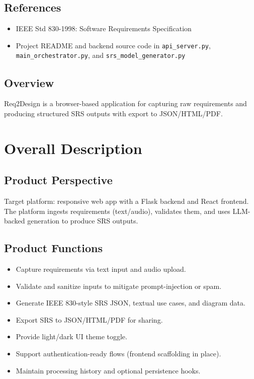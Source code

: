 \documentclass[11pt]{article}
\begin{document}
\subsection{References}
\begin{itemize}
  \item IEEE Std 830-1998: Software Requirements Specification
  \item Project README and backend source code in \texttt{api\_server.py}, \texttt{main\_orchestrator.py}, and \texttt{srs\_model\_generator.py}
\end{itemize}

\subsection{Overview}
Req2Design is a browser-based application for capturing raw requirements and producing structured SRS outputs with export to JSON/HTML/PDF.

\section{Overall Description}
\subsection{Product Perspective}
Target platform: responsive web app with a Flask backend and React frontend. The platform ingests requirements (text/audio), validates them, and uses LLM-backed generation to produce SRS outputs.

\subsection{Product Functions}
\begin{itemize}
  \item Capture requirements via text input and audio upload.
  \item Validate and sanitize inputs to mitigate prompt-injection or spam.
  \item Generate IEEE 830-style SRS JSON, textual use cases, and diagram data.
  \item Export SRS to JSON/HTML/PDF for sharing.
  \item Provide light/dark UI theme toggle.
  \item Support authentication-ready flows (frontend scaffolding in place).
  \item Maintain processing history and optional persistence hooks.
\end{itemize}
\end{document}
